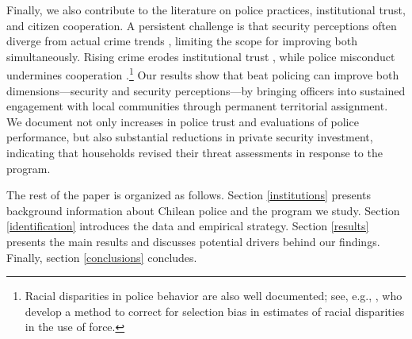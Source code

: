 Finally, we also contribute to the literature on police practices, institutional trust, and citizen cooperation. A persistent challenge is that security perceptions often diverge from actual crime trends \citep{Ajzenman_Pato}, limiting the scope for improving both simultaneously. Rising crime erodes institutional trust \citep{Blanco_2025}, while police misconduct undermines cooperation \citep{ang_etal_2025}.\footnote{Racial disparities in police behavior are also well documented; see, e.g., \citet{Goncalves_etal_2025}, who develop a method to correct for selection bias in estimates of racial disparities in the use of force.} Our results show that beat policing can improve both dimensions---security and security perceptions---by bringing officers into sustained engagement with local communities through permanent territorial assignment. We document not only increases in police trust and evaluations of police performance, but also substantial reductions in private security investment, indicating that households revised their threat assessments in response to the program. 


The rest of the paper is organized as follows. Section \ref{institutions} presents background information about Chilean police and the program we study. Section \ref{identification} introduces the data and empirical strategy. Section \ref{results} presents the main results and discusses potential drivers behind our findings. Finally, section \ref{conclusions} concludes.